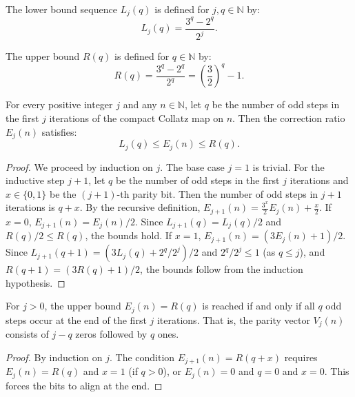 \begin{definition}\label{def:L}\leanok
The lower bound sequence $L_j(q)$ is defined for $j, q \in \mathbb{N}$ by:
\begin{equation}
    L_j(q) = \frac{3^q - 2^q}{2^j}.
\end{equation}
\end{definition}

\begin{definition}\label{def:R}\leanok
The upper bound $R(q)$ is defined for $q \in \mathbb{N}$ by:
\begin{equation}
    R(q) = \frac{3^q - 2^q}{2^q} = \left(\frac{3}{2}\right)^q - 1.
\end{equation}
\end{definition}

\begin{theorem}\label{theorem:E_bounds}\leanok
For every positive integer $j$ and any $n \in \mathbb{N}$, let $q$ be the number of odd steps in the first $j$ iterations of the compact Collatz map on $n$. Then the correction ratio $E_j(n)$ satisfies:
\begin{equation}
    L_j(q) \le E_j(n) \le R(q).
\end{equation}
\end{theorem}
\begin{proof}\leanok
We proceed by induction on $j$. The base case $j=1$ is trivial. For the inductive step $j+1$, let $q$ be the number of odd steps in the first $j$ iterations and $x \in \{0, 1\}$ be the $(j+1)$-th parity bit. Then the number of odd steps in $j+1$ iterations is $q+x$.
By the recursive definition, $E_{j+1}(n) = \frac{3^x}{2} E_j(n) + \frac{x}{2}$.
If $x=0$, $E_{j+1}(n) = E_j(n)/2$. Since $L_{j+1}(q) = L_j(q)/2$ and $R(q)/2 \le R(q)$, the bounds hold.
If $x=1$, $E_{j+1}(n) = (3E_j(n) + 1)/2$. Since $L_{j+1}(q+1) = (3L_j(q) + 2^q/2^j)/2$ and $2^q/2^j \le 1$ (as $q \le j$), and $R(q+1) = (3R(q) + 1)/2$, the bounds follow from the induction hypothesis.
\end{proof}

\begin{theorem}\label{theorem:E_upper_bound_iff}\leanok
For $j > 0$, the upper bound $E_j(n) = R(q)$ is reached if and only if all $q$ odd steps occur at the end of the first $j$ iterations. That is, the parity vector $V_j(n)$ consists of $j-q$ zeros followed by $q$ ones.
\end{theorem}
\begin{proof}\leanok
By induction on $j$. The condition $E_{j+1}(n) = R(q+x)$ requires $E_j(n) = R(q)$ and $x=1$ (if $q>0$), or $E_j(n)=0$ and $q=0$ and $x=0$. This forces the bits to align at the end.
\end{proof}

